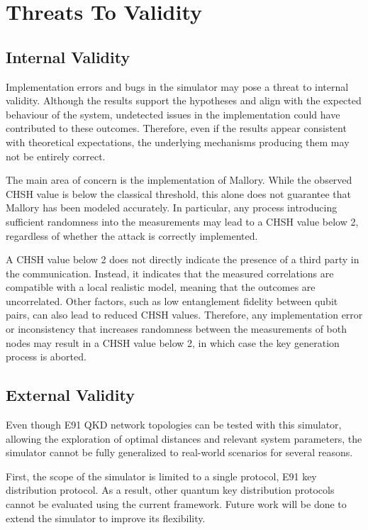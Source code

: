 \section{Threats To Validity}\label{sec:threats}

\subsection{Internal Validity}

Implementation errors and bugs in the simulator may pose a threat to internal validity. Although the results support the hypotheses and align with the expected behaviour of the system, undetected issues in the implementation could have contributed to these outcomes. Therefore, even if the results appear consistent with theoretical expectations, the underlying mechanisms producing them may not be entirely correct.

The main area of concern is the implementation of Mallory. While the observed CHSH value is below the classical threshold, this alone does not guarantee that Mallory has been modeled accurately. In particular, any process introducing sufficient randomness into the measurements may lead to a CHSH value below 2, regardless of whether the attack is correctly implemented.

A CHSH value below 2 does not directly indicate the presence of a third party in the communication. Instead, it indicates that the measured correlations are compatible with a local realistic model, meaning that the outcomes are uncorrelated. Other factors, such as low entanglement fidelity between qubit pairs, can also lead to reduced CHSH values. Therefore, any implementation error or inconsistency that increases randomness between the measurements of both nodes may result in a CHSH value below 2, in which case the key generation process is aborted.

\subsection{External Validity}

Even though E91 QKD network topologies can be tested with this simulator, allowing the exploration of optimal distances and relevant system parameters, the simulator cannot be fully generalized to real-world scenarios for several reasons.

First, the scope of the simulator is limited to a single protocol, E91 key distribution protocol. As a result, other quantum key distribution protocols cannot be evaluated using the current framework. Future work will be done to extend the simulator to improve its flexibility.


